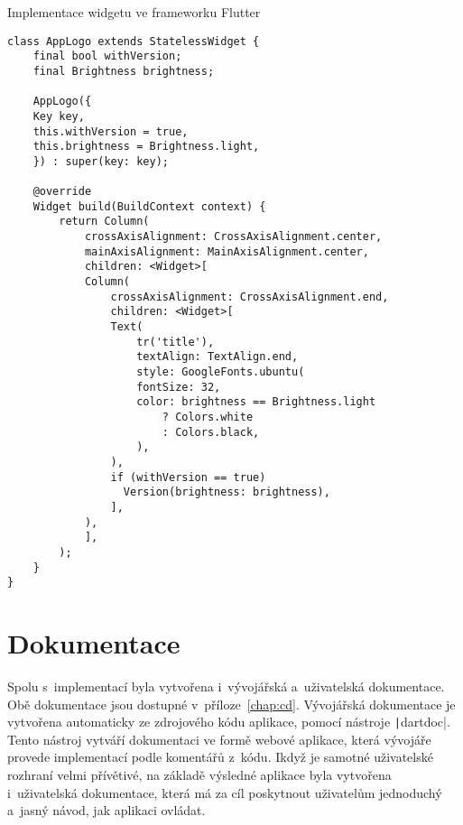 \begin{listing}
    \caption{Implementace widgetu ve frameworku Flutter}
    \label{code:implementation-1}
    \begin{verbatim}
class AppLogo extends StatelessWidget {
    final bool withVersion;
    final Brightness brightness;

    AppLogo({
    Key key,
    this.withVersion = true,
    this.brightness = Brightness.light,
    }) : super(key: key);

    @override
    Widget build(BuildContext context) {
        return Column(
            crossAxisAlignment: CrossAxisAlignment.center,
            mainAxisAlignment: MainAxisAlignment.center,
            children: <Widget>[
            Column(
                crossAxisAlignment: CrossAxisAlignment.end,
                children: <Widget>[
                Text(
                    tr('title'),
                    textAlign: TextAlign.end,
                    style: GoogleFonts.ubuntu(
                    fontSize: 32,
                    color: brightness == Brightness.light
                        ? Colors.white
                        : Colors.black,
                    ),
                ),
                if (withVersion == true)
                  Version(brightness: brightness),
                ],
            ),
            ],
        );
    }
}
    \end{verbatim}
\end{listing}


\section{Dokumentace}

Spolu s~implementací byla vytvořena i~vývojářská a~uživatelská dokumentace.
Obě dokumentace jsou dostupné v~příloze~\ref{chap:cd}.
Vývojářská dokumentace je vytvořena automaticky ze zdrojového kódu aplikace,
pomocí nástroje \texttt|dartdoc|.
Tento nástroj vytváří dokumentaci ve formě webové aplikace,
která vývojáře provede implementací podle komentářů z~kódu.
Ikdyž je samotné uživatelské rozhraní velmi přívětivé,
na základě výsledné aplikace byla vytvořena i~uživatelská dokumentace,
která má za cíl poskytnout uživatelům jednoduchý a~jasný návod,
jak aplikaci ovládat.

